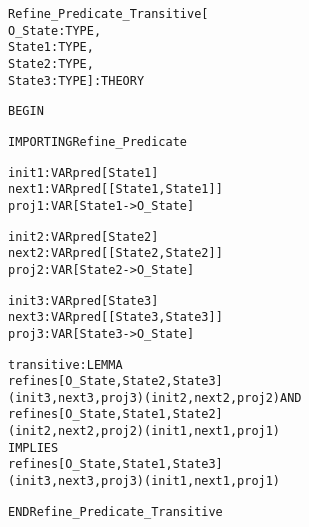 \newpage
\begin{alltt}
%%%%%%%%%%%%%%%%%%%%%%%%%%%%%%%%%%%%%%%%%%%%%%%%%%%%%%
% Refine_Predicate_Transitive :                      %
%   States as a lemma that refinement is transitive. %
%%%%%%%%%%%%%%%%%%%%%%%%%%%%%%%%%%%%%%%%%%%%%%%%%%%%%%

Refine_Predicate_Transitive[
  O_State : TYPE,
  State1  : TYPE,
  State2  : TYPE,
  State3  : TYPE] : THEORY

BEGIN

  IMPORTING Refine_Predicate

  init1 : VAR pred[State1]
  next1 : VAR pred[[State1,State1]]
  proj1 : VAR [State1 -> O_State]

  init2 : VAR pred[State2]
  next2 : VAR pred[[State2,State2]]
  proj2 : VAR [State2 -> O_State]
  
  init3 : VAR pred[State3]
  next3 : VAR pred[[State3,State3]]
  proj3 : VAR [State3 -> O_State]

  transitive : LEMMA 
    refines[O_State,State2,State3]
      (init3,next3,proj3)(init2,next2,proj2) AND 
    refines[O_State,State1,State2]
      (init2,next2,proj2)(init1,next1,proj1)
      IMPLIES
    refines[O_State,State1,State3]
      (init3,next3,proj3)(init1,next1,proj1)

END Refine_Predicate_Transitive
\end{alltt}

